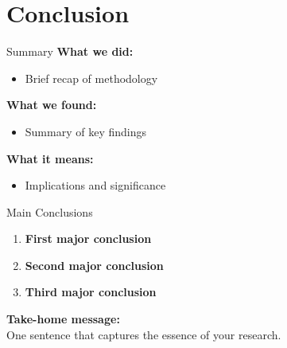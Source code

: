 \documentclass[aspectratio=169]{beamer}
\begin{document}
	\section{Conclusion}
	
	\begin{frame}{Summary}
		\textbf{What we did:}
		\begin{itemize}
			\item Brief recap of methodology
		\end{itemize}
		
		\vspace{0.5em}
		
		\textbf{What we found:}
		\begin{itemize}
			\item Summary of key findings
		\end{itemize}
		
		\vspace{0.5em}
		
		\textbf{What it means:}
		\begin{itemize}
			\item Implications and significance
		\end{itemize}
	\end{frame}
	
	\begin{frame}{Main Conclusions}
		\begin{enumerate}
			\item \textbf{First major conclusion}
			\item \textbf{Second major conclusion}
			\item \textbf{Third major conclusion}
		\end{enumerate}
		
		\vspace{2em}
		
		\begin{center}
			\Large
			\textbf{Take-home message:}\\[0.5em]
			One sentence that captures the essence of your research.
		\end{center}
	\end{frame}
	
\end{document}
